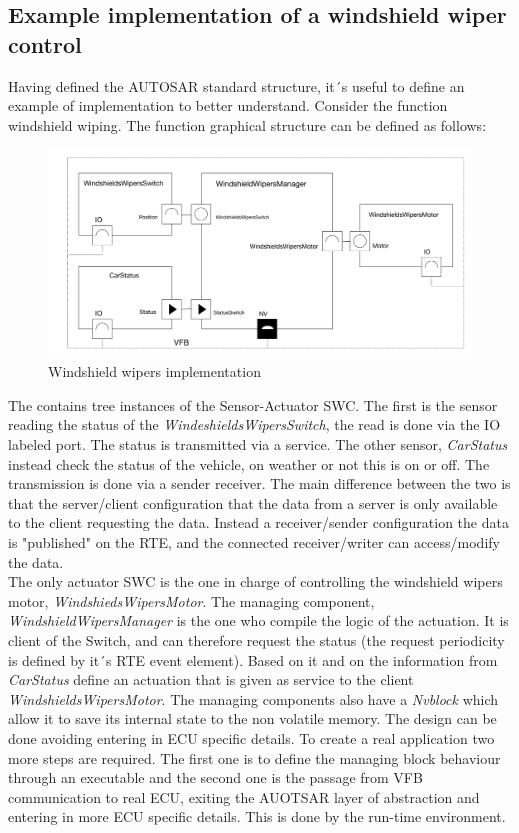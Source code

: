 \documentclass[../main.tex]{subfiles}
\begin{document}
\subsection{Example implementation of a windshield wiper control}
Having defined the AUTOSAR standard structure, it´s useful to define an example of implementation to better understand. Consider the function windshield wiping. The function graphical structure can be defined as follows:
\begin{figure}[H]
    \centering
    \includegraphics[width=\linewidth]{images_folder/windshield_WIpers_aUtosar.jpeg}
    \caption{Windshield wipers implementation}
    \label{fig:WINWIP}
\end{figure}
The contains tree instances of the Sensor-Actuator SWC. The first is the sensor reading the status of the \textit{WindeshieldsWipersSwitch}, the read is done via the IO labeled port. The status is transmitted via a service. The other sensor, \textit{CarStatus} instead check the status of the vehicle, on weather or not this is on or off. The transmission is done via a sender receiver. The main difference between the two is that the server/client configuration that the data from a server is only available to the client requesting the data. Instead a receiver/sender configuration the data is "published" on the RTE, and the connected receiver/writer can access/modify the data.\\
The only actuator SWC is the one in charge of controlling the windshield wipers motor, \textit{WindshiedsWipersMotor}. The managing component, \textit{WindshieldWipersManager} is the one who compile the logic of the actuation. It is client of the Switch, and can therefore request the status (the request periodicity is defined by it´s RTE event element). Based on it and on the information from \textit{CarStatus} define an actuation that is given as service to the client \textit{WindshieldsWipersMotor}. The managing components also have a \textit{Nvblock} which allow it to save its internal state to the non volatile memory. 
The design can be done avoiding entering in ECU specific details. To create a real application two more steps are required. The first one is to define the managing block behaviour through an executable and the second one is the passage from VFB communication to real ECU, exiting the AUOTSAR layer of abstraction and entering in more ECU specific details. This is done by the run-time environment. 
\end{document}
